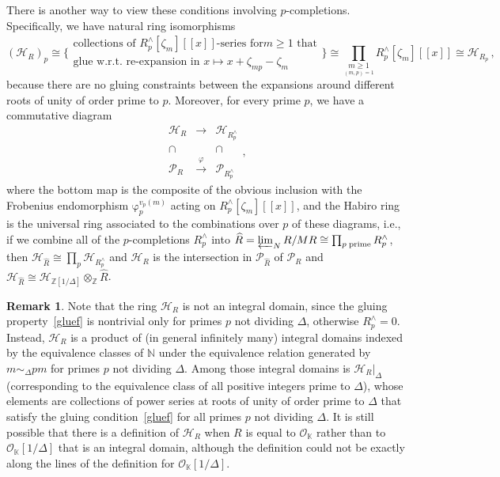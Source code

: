 \documentclass[12pt,reqno]{amsart}
\theoremstyle{definition}
\newtheorem{remark}[proposition]{Remark}
\def\BN{\mathbb N}
\def\BZ{\mathbb Z}
\def\BK{\mathbb K}
\def\calP{\mathcal P}
\def\calH{\mathcal H}
\def\be{\begin{equation}}
\def\ee{\end{equation}}
\def\z{\zeta}
\def\calO{\mathcal{O}}
\def\fr{\mathrm{\varphi}_p}
\begin{document}
There is another way to view these conditions involving $p$-completions.
Specifically, we have natural ring isomorphisms
\be
\label{eq.habp}
(\calH_R)_p \cong \Big\{
\begin{matrix}\text{collections of $R^\wedge_p[\z_m][\![x]\!]$-series for
$m \geq 1$ that}\\
\text{glue w.r.t. re-expansion in $x\mapsto x+\z_{mp}-\z_m$} \end{matrix} \Big\} \cong
\prod_{\underset{(m,p)=1}{m \geq 1}} R^\wedge_p [\z_{m}][\![x]\!]
\cong \calH_{R_p} \,, 
\ee
because there are no gluing constraints between the expansions
around different roots of unity of order prime to $p$. 
Moreover, for every prime $p$, we have a commutative diagram
\be
\label{Hviapcomp}
\begin{array}{ccc}
  \calH_R & \longrightarrow & \calH_{R^\wedge_p}\\
  \cap &  & \cap\\
  \calP_R & \overset{\varphi}{\longrightarrow} & \calP_{R^\wedge_p}
\end{array},
\ee
where the bottom map is the composite of the obvious inclusion with the Frobenius
endomorphism $\fr^{v_p(m)}$ acting on $R^\wedge_p [\z_{m}][\![x]\!]$,
and the Habiro ring is the universal ring associated to the combinations over $p$
of these diagrams, i.e.,
if we combine all of the $p$-completions $R_p^{\wedge}$ into
$\widehat{R}=\varprojlim_{N}R/MR\cong\prod_{p\;\text{prime}}R_p^{\wedge}$, then 
$\calH_{\widehat{R}}\cong\prod_{p}\calH_{R_p^\wedge}$ and $\calH_R$ is the intersection
in $\calP_{\widehat{R}}$ of $\calP_R$ and
$\calH_{\widehat{R}}\cong\calH_{\BZ[1/\Delta]}\otimes_{\BZ}\widehat{R}$.

\begin{remark}
\label{rem.domain}
Note that the ring $\calH_R$ is not an integral domain, since the gluing
property~\eqref{gluef} is nontrivial only for primes $p$ not dividing $\Delta$,
otherwise $R^\wedge_p=0$. Instead, $\calH_R$ is a product of (in general infinitely
many) integral domains indexed
by the equivalence classes of $\BN$ under the equivalence relation generated by
$m \sim_\Delta pm$
for primes $p$ not dividing $\Delta$. Among those
integral domains is $\calH_{R}|_\Delta$ (corresponding to the equivalence class of
all positive integers prime to $\Delta$), whose elements are collections of
power series at roots of unity of order prime to $\Delta$ that satisfy the
gluing condition~\eqref{gluef} for all primes $p$ not dividing $\Delta$.
It is still possible that there is a definition of $\calH_R$ when $R$ is equal to
$\calO_\BK$ rather than to $\calO_\BK[1/\Delta]$ that is an integral domain,
although the definition could not be exactly along the lines of the definition
for $\calO_\BK[1/\Delta]$.
\end{remark}
\end{document}
